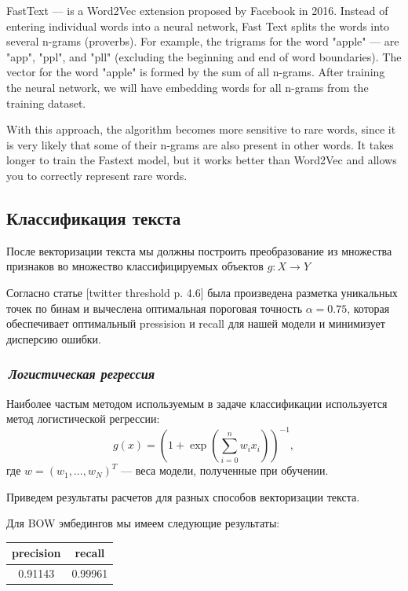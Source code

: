 \documentclass[12pt]{article}
\begin{document}
FastText --- is a Word2Vec extension proposed by Facebook in 2016. Instead of entering individual words into a neural network, Fast Text splits the words into several n-grams (proverbs). For example, the trigrams for the word "apple" --- are "app", "ppl", and "pll" (excluding the beginning and end of word boundaries). The vector for the word "apple" is formed by the sum of all n-grams. After training the neural network, we will have embedding words for all n-grams from the training dataset.

With this approach, the algorithm becomes more sensitive to rare words, since it is very likely that some of their n-grams are also present in other words. It takes longer to train the Fastext model, but it works better than Word2Vec and allows you to correctly represent rare words.

\subsection*{Классификация текста}
После векторизации текста мы должны построить преобразование из множества признаков во множество классифицируемых объектов $g: X \rightarrow Y$ 

Согласно статье [twitter threshold p. 4.6] была произведена разметка уникальных точек по бинам и вычеслена оптимальная пороговая точность $\alpha = 0.75$, которая обеспечивает оптимальный pressision и recall для нашей модели и минимизует дисперсию ошибки.

\subsubsection*{\it\,Логистическая регрессия}
Наиболее частым методом используемым в задаче классификации используется метод логистической регрессии:
$$
g(x) = \left(1 + \exp{ \left( \sum_{i=0}^n w_i x_i  \right) }\right)^{-1},
$$
где $w=(w_1, ..., w_N)^T$ --- веса модели, полученные при обучении.

Приведем результаты расчетов для разных способов векторизации текста.

Для BOW эмбедингов мы имеем следующие результаты:
\begin{center}
  \begin{tabular}{ | c | c |}
    \hline
     precision & recall \\ \hline
     0.91143 & 0.99961 \\ \hline
  \end{tabular}
\end{center}
\end{document}
